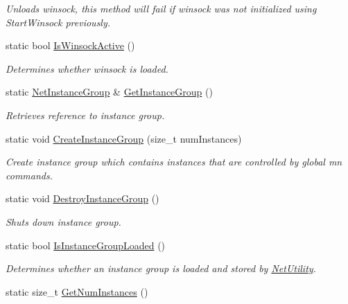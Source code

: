 \begin{DoxyCompactItemize}
\begin{DoxyCompactList}\small\item\em Unloads winsock, this method will fail if winsock was not initialized using StartWinsock previously. \item\end{DoxyCompactList}\item 
static bool \hyperlink{class_net_utility_a6fd358e07da83faaf8306171426e5362}{IsWinsockActive} ()
\begin{DoxyCompactList}\small\item\em Determines whether winsock is loaded. \item\end{DoxyCompactList}\item 
static \hyperlink{class_net_instance_group}{NetInstanceGroup} \& \hyperlink{class_net_utility_ae66ffeb5d6e0092c8bedc44f73392200}{GetInstanceGroup} ()
\begin{DoxyCompactList}\small\item\em Retrieves reference to instance group. \item\end{DoxyCompactList}\item 
static void \hyperlink{class_net_utility_a38666920bbd1d7dd972f5f9129e72be7}{CreateInstanceGroup} (size\_\-t numInstances)
\begin{DoxyCompactList}\small\item\em Create instance group which contains instances that are controlled by global mn commands. \item\end{DoxyCompactList}\item 
static void \hyperlink{class_net_utility_a485f7c662aa0f79182939d918d588f54}{DestroyInstanceGroup} ()
\begin{DoxyCompactList}\small\item\em Shuts down instance group. \item\end{DoxyCompactList}\item 
static bool \hyperlink{class_net_utility_a9fc6fa46016bc244ac943411a0c1e0f9}{IsInstanceGroupLoaded} ()
\begin{DoxyCompactList}\small\item\em Determines whether an instance group is loaded and stored by \hyperlink{class_net_utility}{NetUtility}. \item\end{DoxyCompactList}\item 
static size\_\-t \hyperlink{class_net_utility_a0bfef73df16524b55ffb08aae84a1de3}{GetNumInstances} ()

\end{DoxyCompactItemize}
